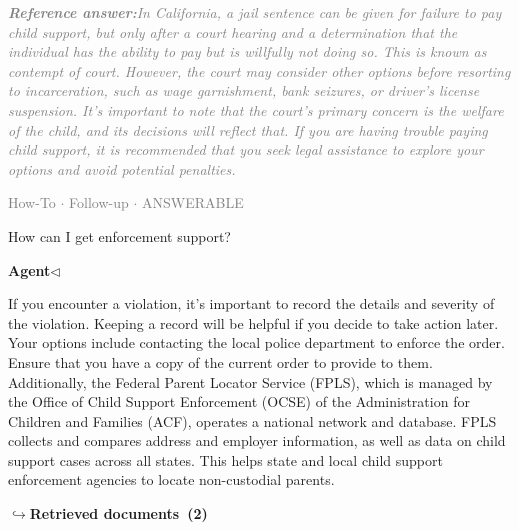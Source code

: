 \documentclass[a4paper,11pt]{article}
\begin{document}
\begin{refanswerenv}
{\footnotesize\textit{\textcolor{gray}{\textbf{Reference answer:}\enspace In California, a jail sentence can be given for failure to pay child support, but only after a court hearing and a determination that the individual has the ability to pay but is willfully not doing so. This is known as contempt of court. However, the court may consider other options before resorting to incarceration, such as wage garnishment, bank seizures, or driver's license suspension. It's important to note that the court's primary concern is the welfare of the child, and its decisions will reflect that. If you are having trouble paying child support, it is recommended that you seek legal assistance to explore your options and avoid potential penalties.}}}
\end{refanswerenv}
\vspace{0.5em}
\hfill{\tiny\textcolor{gray}{How-To $\cdot$ Follow-up $\cdot$ ANSWERABLE}}
\begin{userbubble}
How can I get enforcement support?
\end{userbubble}
\noindent\hfill{\small\textcolor{agentcolor}{\textbf{Agent\enspace$\triangleleft$}}}
\begin{agentbubble}
If you encounter a violation, it's important to record the details and severity of the violation. Keeping a record will be helpful if you decide to take action later. Your options include contacting the local police department to enforce the order. Ensure that you have a copy of the current order to provide to them. Additionally, the Federal Parent Locator Service (FPLS), which is managed by the Office of Child Support Enforcement (OCSE) of the Administration for Children and Families (ACF), operates a national network and database. FPLS collects and compares address and employer information, as well as data on child support cases across all states. This helps state and local child support enforcement agencies to locate non-custodial parents.
\end{agentbubble}
\noindent\hfill{\footnotesize\textcolor{doccolor}{\textbf{$\hookrightarrow$\enspace Retrieved documents~(2)}}}
\end{document}
